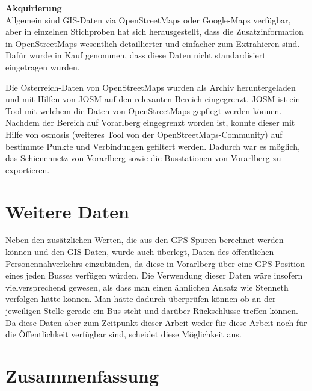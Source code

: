 \textbf{Akquirierung}\\
Allgemein sind GIS-Daten via OpenStreetMaps oder Google-Maps verfügbar, aber in einzelnen Stichproben hat sich herausgestellt, dass die Zusatzinformation in OpenStreetMaps wesentlich detaillierter und einfacher zum Extrahieren sind. Dafür wurde in Kauf genommen, dass diese Daten nicht standardisiert eingetragen wurden.

Die Österreich-Daten von OpenStreetMaps wurden als Archiv heruntergeladen und mit Hilfen von JOSM auf den relevanten Bereich eingegrenzt. JOSM ist ein Tool mit welchem die Daten von OpenStreetMaps gepflegt werden können. Nachdem der Bereich auf Vorarlberg eingegrenzt worden ist, konnte dieser mit Hilfe von osmosis (weiteres Tool von der OpenStreetMaps-Community) auf bestimmte Punkte und Verbindungen gefiltert werden. Dadurch war es möglich, das Schienennetz von Vorarlberg sowie die Busstationen von Vorarlberg zu exportieren.


\section{Weitere Daten}
Neben den zusätzlichen Werten, die aus den GPS-Spuren berechnet werden können und den GIS-Daten, wurde auch überlegt, Daten des öffentlichen Personennahverkehrs einzubinden, da diese in Vorarlberg über eine GPS-Position eines jeden Busses verfügen würden. Die Verwendung dieser Daten wäre insofern vielversprechend gewesen, als dass man einen ähnlichen Ansatz wie Stenneth verfolgen hätte können. Man hätte dadurch überprüfen können ob an der jeweiligen Stelle gerade ein Bus steht und darüber Rückschlüsse treffen können. Da diese Daten aber zum Zeitpunkt dieser Arbeit weder für diese Arbeit noch für die Öffentlichkeit verfügbar sind, scheidet diese Möglichkeit aus.

\clearpage

\section{Zusammenfassung}
